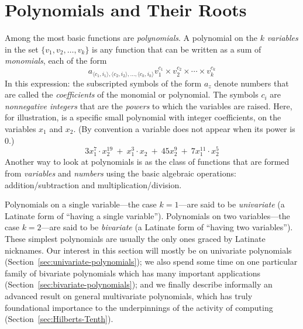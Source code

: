 \section{Polynomials and Their Roots}
\label{sec:polynomials}

 
    
 
 

Among the most basic functions are {\it polynomials}.  A polynomial on the $k$ {\it variables}  in the set $\{v_1, v_2, \ldots, v_k\}$ is any function that can be written as a sum of {\it monomials}, 
each of the form
\begin{equation}
\label{eq:monomial}
a_{\langle c_1, i_1 \rangle, \langle c_2, i_2 \rangle, \ldots,  \langle c_k, i_k \rangle} 
v_1^{c_1} \times v_2^{c_2} \times \cdots \times v_k^{c_k}
\end{equation}
In this expression: the subscripted symbols of the form $a_z$ denote numbers that are called the {\it coefficients} of the monomial or polynomial.  The symbols $c_i$ are {\em nonnegative integers} that are the {\it powers} to which the variables are raised.  Here, for illustration, is a specific small polynomial with integer coefficients, on the variables $x_1$ and $x_2$.  (By convention a variable does not appear when its power is $0$.)
\[ 
3 x_1^7 \cdot x_2^{19} \ + \ x_1^3 \cdot x_2 \ + \ 45 x_2^{9} \ + \ 7 x_1^{11} \cdot x_2^{5}
\]
Another way to look at polynomials is as the class of functions that are formed from {\it variables} and {\it numbers} using the basic algebraic operations: addition/subtraction and
multiplication/division.

\medskip

 

Polynomials on a single variable---the case $k=1$---are said to be {\it univariate} (a Latinate form of ``having a single variable'').  Polynomials on two variables---the case $k=2$---are said to be {\it bivariate} (a Latinate form of ``having two variables'').  These simplest polynomials are usually the only ones graced by Latinate nicknames.  Our interest in this section will mostly be on univariate polynomials (Section~\ref{sec:univariate-polynomials}); we also spend some time on one particular family of bivariate polynomials which has many important applications (Section~\ref{sec:bivariate-polynomials}); and we finally describe informally an advanced result on general multivariate polynomials, which has truly foundational importance to the underpinnings of the activity of computing (Section~\ref{sec:Hilberts-Tenth}).

